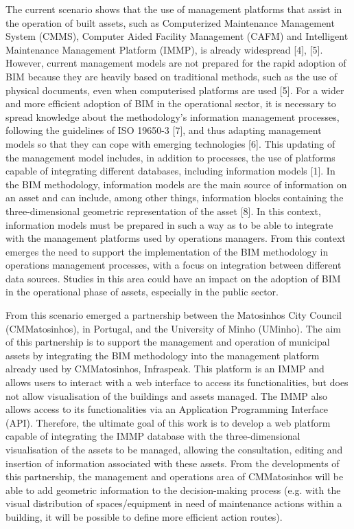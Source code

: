 \documentclass[a4paper, 10pt, twocolumn, twoside]{article}
\begin{document}
The current scenario shows that the use of management platforms that assist in the operation of built assets, such as Computerized Maintenance Management System (CMMS), Computer Aided Facility Management (CAFM) and Intelligent Maintenance Management Platform (IMMP), is already widespread [4], [5]. However, current management models are not prepared for the rapid adoption of BIM because they are heavily based on traditional methods, such as the use of physical documents, even when computerised platforms are used [5]. For a wider and more efficient adoption of BIM in the operational sector, it is necessary to spread knowledge about the methodology's information management processes, following the guidelines of ISO 19650-3 [7], and thus adapting management models so that they can cope with emerging technologies [6]. This updating of the management model includes, in addition to processes, the use of platforms capable of integrating different databases, including information models [1]. In the BIM methodology, information models are the main source of information on an asset and can include, among other things, information blocks containing the three-dimensional geometric representation of the asset [8]. In this context, information models must be prepared in such a way as to be able to integrate with the management platforms used by operations managers. From this context emerges the need to support the implementation of the BIM methodology in operations management processes, with a focus on integration between different data sources. Studies in this area could have an impact on the adoption of BIM in the operational phase of assets, especially in the public sector.

From this scenario emerged a partnership between the Matosinhos City Council (CMMatosinhos), in Portugal, and the University of Minho (UMinho). The aim of this partnership is to support the management and operation of municipal assets by integrating the BIM methodology into the management platform already used by CMMatosinhos, Infraspeak. This platform is an IMMP and allows users to interact with a web interface to access its functionalities, but does not allow visualisation of the buildings and assets managed. The IMMP also allows access to its functionalities via an Application Programming Interface (API). Therefore, the ultimate goal of this work is to develop a web platform capable of integrating the IMMP database with the three-dimensional visualisation of the assets to be managed, allowing the consultation, editing and insertion of information associated with these assets. From the developments of this partnership, the management and operations area of CMMatosinhos will be able to add geometric information to the decision-making process (e.g. with the visual distribution of spaces/equipment in need of maintenance actions within a building, it will be possible to define more efficient action routes).
\end{document}
